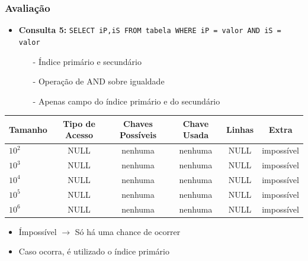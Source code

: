 \documentclass[10pt]{beamer}
\begin{document}
\begin{frame}[fragile]
  \frametitle{Avaliação}

    \begin{itemize}
      \item \textbf{Consulta 5: } \footnotesize{\texttt{SELECT iP,iS FROM tabela WHERE iP = valor AND iS = valor}}
      \begin{itemize}
        \item[-] Índice primário e secundário
        \item[-] Operação de AND sobre igualdade
        \item[-] Apenas campo do índice primário e do secundário
      \end{itemize}

    \end{itemize}

     \begin{table}[!htb]
    \footnotesize
    \centering
    \begin{tabular}{lccccc}
      \toprule
      \textbf{Tamanho} & \textbf{Tipo de Acesso}  & \textbf{Chaves Possíveis}  & \textbf{Chave Usada} & \textbf{Linhas} & \textbf{Extra}  \\
      \midrule
      $10^2$  & NULL  &  nenhuma  & nenhuma  & NULL  & impossível \\
      $10^3$  & NULL  &  nenhuma  & nenhuma  & NULL  & impossível \\
      $10^4$  & NULL  &  nenhuma  & nenhuma  & NULL  & impossível \\
      $10^5$  & NULL  &  nenhuma  & nenhuma  & NULL  & impossível \\
      $10^6$  & NULL  &  nenhuma  & nenhuma  & NULL  & impossível \\

      \bottomrule
    \end{tabular}
    \end{table}
   
    \begin{itemize}
    \item Ímpossível $\to$ Só há uma chance de ocorrer
    \item Caso ocorra, é utilizado o índice primário
    \end{itemize}


\end{frame}
\end{document}
